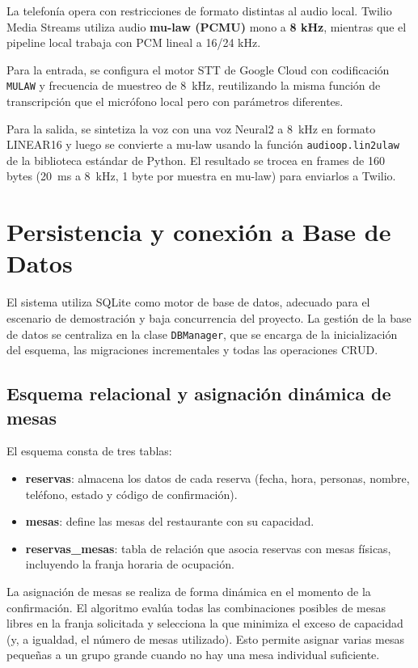 La telefonía opera con restricciones de formato distintas al audio local. Twilio Media Streams utiliza audio \textbf{mu-law (PCMU)} mono a \textbf{8 kHz}, mientras que el pipeline local trabaja con PCM lineal a 16/24 kHz.

Para la entrada, se configura el motor STT de Google Cloud con codificación \texttt{MULAW} y frecuencia de muestreo de 8~kHz, reutilizando la misma función de transcripción que el micrófono local pero con parámetros diferentes.

Para la salida, se sintetiza la voz con una voz Neural2 a 8~kHz en formato LINEAR16 y luego se convierte a mu-law usando la función \texttt{audioop.lin2ulaw} de la biblioteca estándar de Python. El resultado se trocea en frames de 160 bytes (20~ms a 8~kHz, 1 byte por muestra en mu-law) para enviarlos a Twilio.

\section{Persistencia y conexión a Base de Datos}
\label{sec:persistencia_bd}

El sistema utiliza SQLite como motor de base de datos, adecuado para el escenario de demostración y baja concurrencia del proyecto. La gestión de la base de datos se centraliza en la clase \texttt{DBManager}, que se encarga de la inicialización del esquema, las migraciones incrementales y todas las operaciones CRUD.

\subsection{Esquema relacional y asignación dinámica de mesas}
\label{subsec:esquema_mesas}

El esquema consta de tres tablas:

\begin{itemize}
    \item \textbf{reservas}: almacena los datos de cada reserva (fecha, hora, personas, nombre, teléfono, estado y código de confirmación).
    \item \textbf{mesas}: define las mesas del restaurante con su capacidad.
    \item \textbf{reservas\_mesas}: tabla de relación que asocia reservas con mesas físicas, incluyendo la franja horaria de ocupación.
\end{itemize}

La asignación de mesas se realiza de forma dinámica en el momento de la confirmación. El algoritmo evalúa todas las combinaciones posibles de mesas libres en la franja solicitada y selecciona la que minimiza el exceso de capacidad (y, a igualdad, el número de mesas utilizado). Esto permite asignar varias mesas pequeñas a un grupo grande cuando no hay una mesa individual suficiente.

